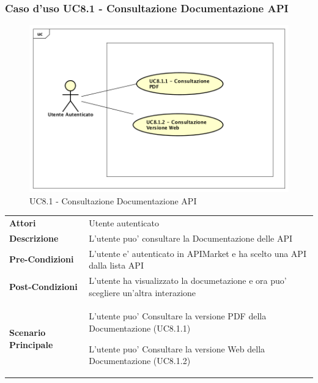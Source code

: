 \subsubsection{Caso d'uso UC8.1 - Consultazione Documentazione API}
\label{UC8.1}
\begin{figure}[ht]
	\centering
	\includegraphics[scale=0.45]{UML/UC8_1.png}
	\caption{UC8.1 - Consultazione Documentazione API}
\end{figure}
\FloatBarrier
\begin{longtable}{ l | p{11cm}}
	\hline
	\rowcolor{Gray}
	\multicolumn{2}{c}{UC8.1 - Consultazione Documentazione API}\\
	\hline
	
	 \textbf{Attori} & Utente autenticato  \\
	\textbf{Descrizione} & L'utente puo' consultare la Documentazione delle API \\
	\textbf{Pre-Condizioni} & L'utente e' autenticato in APIMarket e ha scelto una API dalla lista API\\
	\textbf{Post-Condizioni} & L'utente ha visualizzato la documetazione e ora puo' scegliere un'altra interazione\\
	\textbf{Scenario Principale} & 
	\begin{enumerate*}[label=(\arabic*.),itemjoin={\newline}]
		\item L'utente puo' Consultare la versione PDF della Documentazione (UC8.1.1)
		\item L'utente puo' Consultare la versione Web della Documentazione (UC8.1.2)
	\end{enumerate*}\\
\end{longtable}

